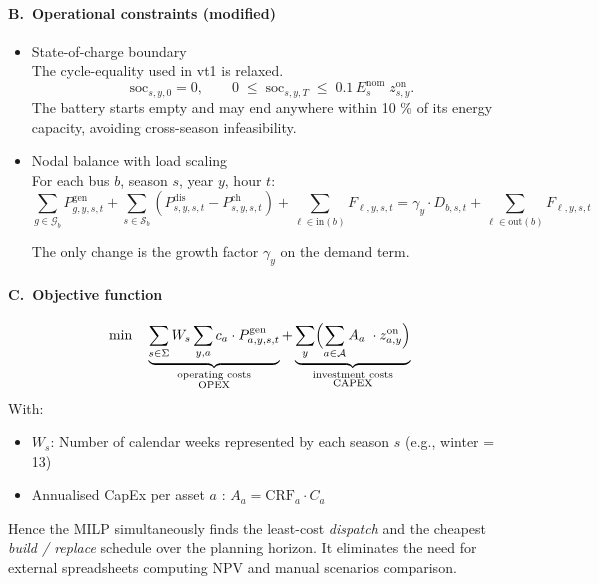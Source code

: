 \paragraph{B.~Operational constraints (modified)}
\begin{itemize}
      \item State-of-charge boundary\\
            The cycle-equality used in vt1 is relaxed.
            \begin{equation}
                  \mathrm{soc}_{s,y,0}=0,\qquad
                  0\;\le\;\mathrm{soc}_{s,y,T}\;\le\;0.1\,E^{\mathrm{nom}}_{s}\; z^{\text{on}}_{s,y}.
            \end{equation}
            The battery starts empty and may end anywhere within 10 \% of its energy capacity, avoiding cross-season 
            infeasibility.
      
      \item Nodal balance with load scaling\\
            For each bus $b$, season $s$, year $y$, hour $t$:
            \begin{equation}
                  \sum_{g \in \mathcal{G}_b} P^{\text{gen}}_{g,y,s,t} +
                  \sum_{s \in \mathcal{S}_b} (P^{\text{dis}}_{s,y,s,t} - P^{\text{ch}}_{s,y,s,t}) +
                  \sum_{\ell \in \text{in}(b)} F_{\ell,y,s,t}
                  = 
                  \gamma_y \cdot D_{b,s,t} +
                  \sum_{\ell \in \text{out}(b)} F_{\ell,y,s,t}
                  \label{eq:nodal_new}
            \end{equation}
      
      The only change is the growth factor $\gamma_y$ on the demand term.
\end{itemize}

\paragraph{C.~Objective function}
\begin{equation}
      \min \quad
      \underbrace{\sum_{s \in \Sigma} W_s \sum_{y,a} c_a \cdot P^{\text{gen}}_{a,y,s,t}}_{\substack{\text{operating costs} \\ \text{OPEX}}}
      +
      \underbrace{\sum_{y}\Bigl(
      \sum_{a\in\mathcal{A}}
          A_a \;\cdot z^{\text{on}}_{a,y}\Bigr)}_{\substack{\text{investment costs} \\ \text{CAPEX}}}
  \end{equation}
  With:
  \begin{itemize}
      \item $W_s$: Number of calendar weeks represented by each season $s$ (e.g., winter = 13)
      \item Annualised CapEx per asset $a$ : $A_a = \mathrm{CRF}_a \cdot C_a$ 
  \end{itemize}  
Hence the MILP simultaneously finds the least-cost \emph{dispatch} and the cheapest \emph{build / replace} schedule over the planning horizon. It eliminates the need for external spreadsheets computing NPV and manual scenarios comparison.

